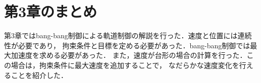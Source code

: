 
\section{第3章のまとめ}

第3章ではbang-bang制御による軌道制御の解説を行った．速度と位置には連続性が必要であり，
拘束条件と目標を定める必要があった．bang-bang制御では最大加速度を求める必要があった．
また，速度が台形の場合の計算を行った．この場合は，拘束条件に最大速度を追加することで，
なだらかな速度変化を行えることを紹介した．

\newpage
